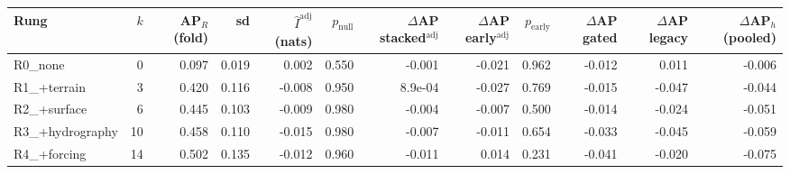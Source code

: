 \begin{tabular}{lrrrrrrrrrrr}
\toprule
Rung & $k$ & AP$_R$ (fold) & sd & $\hat I^{\mathrm{adj}}$ (nats) & $p_{\mathrm{null}}$ & $\Delta$AP stacked$^{\mathrm{adj}}$ & $\Delta$AP early$^{\mathrm{adj}}$ & $p_{\mathrm{early}}$ & $\Delta$AP gated & $\Delta$AP legacy & $\Delta$AP$_h$ (pooled) \\
\midrule
R0\_none & 0 & 0.097 & 0.019 & 0.002 & 0.550 & -0.001 & -0.021 & 0.962 & -0.012 & 0.011 & -0.006 \\
R1\_+terrain & 3 & 0.420 & 0.116 & -0.008 & 0.950 & 8.9e-04 & -0.027 & 0.769 & -0.015 & -0.047 & -0.044 \\
R2\_+surface & 6 & 0.445 & 0.103 & -0.009 & 0.980 & -0.004 & -0.007 & 0.500 & -0.014 & -0.024 & -0.051 \\
R3\_+hydrography & 10 & 0.458 & 0.110 & -0.015 & 0.980 & -0.007 & -0.011 & 0.654 & -0.033 & -0.045 & -0.059 \\
R4\_+forcing & 14 & 0.502 & 0.135 & -0.012 & 0.960 & -0.011 & 0.014 & 0.231 & -0.041 & -0.020 & -0.075 \\
\bottomrule
\end{tabular}
